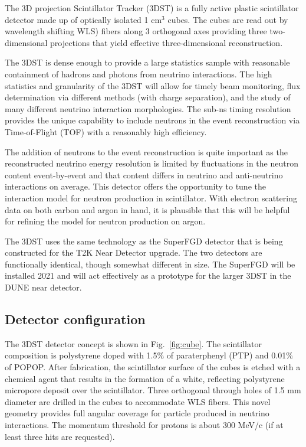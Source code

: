 The 3D projection Scintillator Tracker (3DST) is a fully active plastic scintillator detector made up of optically isolated 1 cm$^{3}$ cubes.  The cubes are read out by wavelength shifting WLS) fibers along 3 orthogonal axes providing three two-dimensional projections that yield effective three-dimensional reconstruction.  


The 3DST is dense enough to provide a large statistics sample with reasonable containment of hadrons and photons from neutrino interactions. The high statistics and granularity  of the 3DST will allow for timely beam monitoring, flux determination via different methods (with charge separation), and the study of many different neutrino interaction morphologies.  The sub-ns timing resolution provides the unique capability to include neutrons in the event reconstruction via Time-of-Flight (TOF) with a reasonably high efficiency.  

The addition of neutrons to the event reconstruction is quite important as the reconstructed neutrino energy resolution is limited by fluctuations in the neutron content event-by-event and that content differs in neutrino and anti-neutrino interactions on average.  This detector offers the opportunity to tune the interaction model for neutron production in scintillator.  With electron scattering data on both carbon and argon in hand, it is plausible that this will be helpful for refining the model for neutron production on argon.    

The 3DST uses the same technology as the SuperFGD detector that is being constructed for the T2K Near Detector upgrade.  The two detectors are functionally identical, though somewhat different in size.  The SuperFGD will be installed 2021 and will act effectively as a prototype for the larger 3DST in the DUNE near detector. 


\subsection{Detector configuration}

The 3DST detector concept is shown in Fig.~\ref{fig:cube}.
The scintillator composition is polystyrene doped with 1.5\% of paraterphenyl (PTP) and 0.01\% of POPOP. After fabrication, the scintillator surface of the cubes is etched with a chemical agent that results in the formation of a white, reflecting polystyrene micropore deposit over the scintillator. Three orthogonal through holes of 1.5 mm diameter are drilled in the cubes to accommodate WLS fibers. 
This novel geometry provides full angular coverage for particle produced in neutrino interactions.  The momentum threshold for protons is about 300 MeV/c (if at least three hits are requested).


